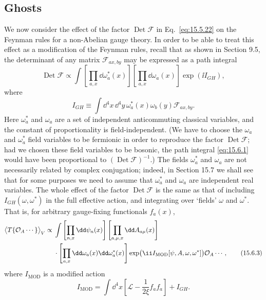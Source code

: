 
\subsection{Ghosts}

We now consider the effect of the factor $\operatorname{Det}\mathcal F$ in
Eq.~\eqref{eq:15.5.22} on the Feynman rules for a non-Abelian gauge theory. In
order to be able to treat this effect as a modification of the Feynman rules,
recall that as shown in Section 9.5, the determinant of any matrix
$\mathcal F_{a x,b y}$ may be expressed as a path integral
\begin{equation}
  \operatorname{Det}\mathcal F\propto
  \int\left[\prod_{a,x}\dd\omega_a^*(x)\right]
  \left[\prod_{a,x}\dd\omega_a(x)\right]\exp(\ii I_{GH}),
  \tag{15.6.1}\label{eq:15.6.1}
\end{equation}
where
\begin{equation}
  I_{GH}\equiv\int \dd^4x\,\dd^4y\,
  \omega_a^*(x)\omega_b(y)\mathcal F_{a x,b y}.
  \tag{15.6.2}\label{eq:15.6.2}
\end{equation}
Here $\omega_a^*$ and $\omega_a$ are a set of independent
anticommuting classical variables, and the constant of proportionality is
field-independent. (We have to choose the $\omega_a$ and
$\omega_a^*$ field variables to be fermionic in order to reproduce the
factor $\operatorname{Det}\mathcal F$; had we chosen these field variables to
be bosonic, the path integral \eqref{eq:15.6.1} would have been proportional to
$(\operatorname{Det}\mathcal F)^{-1}$.) The fields $\omega_a^*$ and
$\omega_a$ are not necessarily related by complex conjugation; indeed,
in Section 15.7 we shall see that for some purposes we need to assume that
$\omega_a^*$ and $\omega_a$ are independent real variables. The
whole effect of the factor $\operatorname{Det}\mathcal F$ is the same as that
of including $I_{GH}(\omega,\omega^*)$ in the full effective action, and
integrating over `fields' $\omega$ and $\omega^*$. That is, for arbitrary
gauge-fixing functionals $f_a(x)$,
\begin{align}
  \bigl\langle T\{\mathcal O_A\cdots\}\bigr\rangle_V
  \propto{}&\int\left[\prod_{n,x}\dd\psi_n(x)\right]
  \left[\prod_{a,\mu,x}\dd A_{a\mu}(x)\right]
  \notag\\
  &\mathbin{\cdot}\left[\prod_{a,x}
  \dd\omega_a(x)\dd\omega_a^*(x)\right]
  \exp\bigl(\ii I_{\mathrm{MOD}}[\psi,A,\omega,\omega^*]\bigr)
  \mathcal O_A\cdots,
  \tag{15.6.3}\label{eq:15.6.3}
\end{align}
where $I_{\mathrm{MOD}}$ is a modified action
\begin{equation}
  I_{\mathrm{MOD}}=\int \dd^4x
  \left[\mathcal L-\frac{1}{2\xi}f_a f_a\right]+I_{GH}.
  \tag{15.6.4}\label{eq:15.6.4}
\end{equation}

